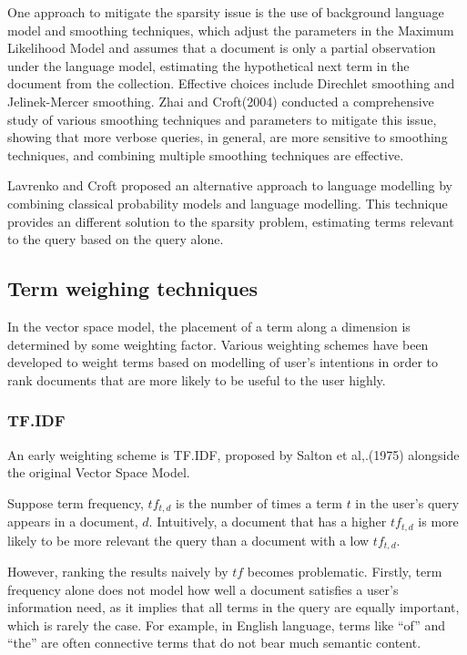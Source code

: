 One approach to mitigate the sparsity issue is the use of background language model and smoothing techniques, which adjust the parameters in the Maximum Likelihood Model and assumes that a document is only a partial observation under the language model, estimating the hypothetical next term in the document from the collection. Effective choices include Direchlet smoothing and Jelinek-Mercer smoothing. Zhai and Croft(2004)\cite{zhai2004study} conducted a comprehensive study of various smoothing techniques and parameters to mitigate this issue, showing that more verbose queries, in general, are more sensitive to smoothing techniques, and combining multiple smoothing techniques are effective. 

Lavrenko and Croft \cite{lavrenko2017relevance} proposed an alternative approach to language modelling by combining classical probability models and language modelling. This technique provides an different solution to the sparsity problem, estimating terms relevant to the query based on the query alone. 

\subsection{Term weighing techniques}

In the vector space model, the placement of a term along a dimension is determined by some weighting factor. Various weighting schemes have been developed to weight terms based on modelling of user's intentions in order to rank documents that are more likely to be useful to the user highly. 

\subsubsection{TF.IDF}
An early weighting scheme is TF.IDF, proposed by Salton et al,.(1975) \cite{Salton:1975:VSM:361219.361220} alongside the original Vector Space Model.

Suppose term frequency,  $tf_{t,d}$ is the number of times a term $t$ in the user's query appears in a document, $d$. Intuitively, a document that has a higher $tf_{t,d}$ is more likely to be more relevant the query than a document with a low $tf_{t,d}$.

However, ranking the results naively by $tf$ becomes problematic. Firstly, term frequency alone does not model how well a document satisfies a user's information need, as it implies that all terms in the query are equally important, which is rarely the case. For example, in English language, terms like ``of'' and ``the'' are often connective terms that do not bear much semantic content.


